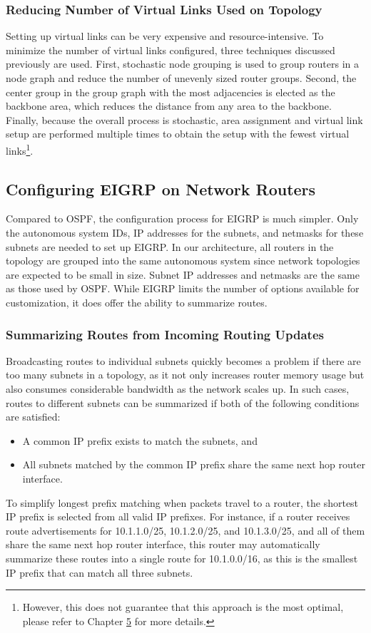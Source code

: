 \documentclass{uiucthesis2021}
\begin{document}
\subsubsection{Reducing Number of Virtual Links Used on Topology}
\noindent Setting up virtual links can be very expensive and resource-intensive. To minimize the number of virtual links configured, three techniques discussed previously are used. First, stochastic node grouping is used to group routers in a node graph and reduce the number of unevenly sized router groups. Second, the center group in the group graph with the most adjacencies is elected as the backbone area, which reduces the distance from any area to the backbone. Finally, because the overall process is stochastic, area assignment and virtual link setup are performed multiple times to obtain the setup with the fewest virtual links\footnote{However, this does not guarantee that this approach is the most optimal, please refer to Chapter \hyperref[c5]{5} for more details.}.

\label{s343}
\subsection{Configuring EIGRP on Network Routers}
\noindent Compared to OSPF, the configuration process for EIGRP is much simpler. Only the autonomous system IDs, IP addresses for the subnets, and netmasks for these subnets are needed to set up EIGRP. In our architecture, all routers in the topology are grouped into the same autonomous system since network topologies are expected to be small in size. Subnet IP addresses and netmasks are the same as those used by OSPF. While EIGRP limits the number of options available for customization, it does offer the ability to summarize routes.\\

\subsubsection{Summarizing Routes from Incoming Routing Updates}
\noindent Broadcasting routes to individual subnets quickly becomes a problem if there are too many subnets in a topology, as it not only increases router memory usage but also consumes considerable bandwidth as the network scales up. In such cases, routes to different subnets can be summarized if both of the following conditions are satisfied: 
\begin{itemize}
    \item A common IP prefix exists to match the subnets, and
    \item All subnets matched by the common IP prefix share the same next hop router interface.
\end{itemize}
\noindent To simplify longest prefix matching when packets travel to a router, the shortest IP prefix is selected from all valid IP prefixes. For instance, if a router receives route advertisements for 10.1.1.0/25, 10.1.2.0/25, and 10.1.3.0/25, and all of them share the same next hop router interface, this router may automatically summarize these routes into a single route for 10.1.0.0/16, as this is the smallest IP prefix that can match all three subnets. \\
\end{document}
